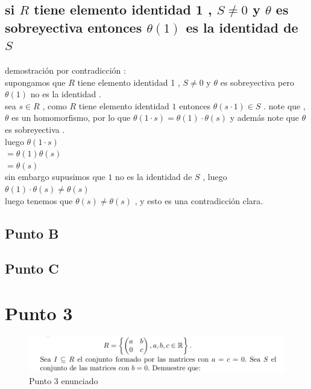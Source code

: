 \documentclass[10pt,a4paper]{article} %
\begin{document}
        \subsection{ si $ R  $ tiene elemento identidad 1 , $ S \not= 0  $
            y $   \theta $ es sobreyectiva entonces $ \theta (1)  $  es la identidad
            de $ S  $  }

            demostración por contradicción :
            \\
            supongamos que $ R  $ tiene elemento identidad 1 , $ S \not= 0
            $  y $ \theta   $ es sobreyectiva pero $ \theta (1)  $ no es la
            identidad .
            \\
            sea $ s \in R  $ , como $ R  $ tiene elemento identidad $ 1  $
            entonces $ \theta (s \cdot 1)  \in S $  . note que , $ \theta   $
            es un homomorfismo, por lo que  $ \theta (1 \cdot s) = \theta
            (1) \cdot \theta (s)  $ y además note que $ \theta  $ es sobreyectiva .
            \\
            luego $ \theta (1 \cdot s)  $
            \\
            $ = \theta (1) \theta (s)  $
            \\
            $ = \theta (s)  $
            \\
            sin embargo supusimos que $ 1  $ no es la identidad de $ S  $ , luego
            \\
            $ \theta(1) \cdot \theta(s) \not= \theta(s)  $
            \\
            luego tenemos que $ \theta (s) \not= \theta (s)  $  , y esto es
            una contradicción clara.

        \subsection{Punto B}
        \subsection{Punto C}


    \section{Punto 3}
        \begin{figure}[h!]
            \centering
            \includegraphics[width=0.8\linewidth]{punto2.png}
            \caption{Punto 3 enunciado}
            \label{fig}
        \end{figure}
\end{document}
